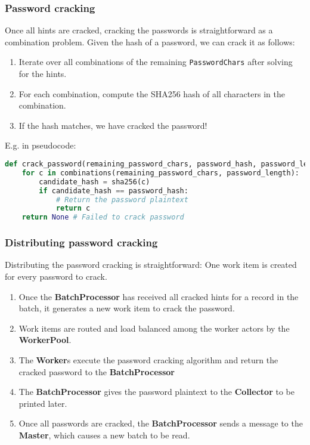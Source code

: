 \documentclass{beamer}
\begin{document}
\begin{frame}[fragile]
	\frametitle{Password cracking}

	Once all hints are cracked, cracking the passwords is straightforward as a combination problem. Given the hash of a password, we can crack it as follows:

	\begin{enumerate}

		\item Iterate over all combinations of the remaining \texttt{PasswordChars} after solving for the hints.
		\item For each combination, compute the SHA256 hash of all characters in the combination.
		\item If the hash matches, we have cracked the password!

	\end{enumerate}

	\pause

	E.g. in pseudocode:

	\begin{lstlisting}[language=Python]
def crack_password(remaining_password_chars, password_hash, password_length):
    for c in combinations(remaining_password_chars, password_length):
        candidate_hash = sha256(c)
        if candidate_hash == password_hash:
            # Return the password plaintext
            return c
    return None # Failed to crack password
\end{lstlisting}

\end{frame}

\begin{frame}
	\frametitle{Distributing password cracking}

	Distributing the password cracking is straightforward: One work item is created for every password to crack.

	\begin{enumerate}

		\item Once the \textbf{BatchProcessor} has received all cracked hints for a record in the batch, it generates a new work item to crack the password.

		\item Work items are routed and load balanced among the worker actors by the \textbf{WorkerPool}.

		\item The \textbf{Worker}s execute the password cracking algorithm and return the cracked password to the \textbf{BatchProcessor}

		\item The \textbf{BatchProcessor} gives the password plaintext to the \textbf{Collector} to be printed later.

		\item Once all passwords are cracked, the \textbf{BatchProcessor} sends a message to the \textbf{Master}, which causes a new batch to be read.

	\end{enumerate}

\end{frame}
\end{document}
